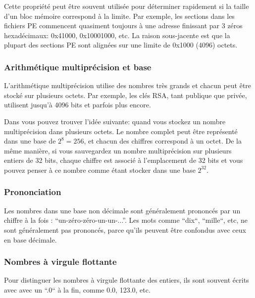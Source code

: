 Cette propriété peut être souvent utilisée pour déterminer rapidement si la taille d'un bloc mémoire correspond à la limite. %
Par exemple, les sections dans les fichiers \ac{PE} commencent quasiment toujours à une adresse finissant par 3 zéros hexadécimaux: 0x41000, 0x10001000, etc.
La raison sous-jacente est que la plupart des sections \ac{PE} sont alignées sur une limite de 0x1000 (4096) octets.

\subsubsection{Arithmétique multiprécision et base}

L'arithmétique multiprécision utilise des nombres très grands et chacun peut être stocké sur plusieurs octets.
Par exemple, les clés RSA, tant publique que privée, utilisent jusqu'à 4096 bits et parfois plus encore.

Dans  vous pouvez trouver l'idée suivante: quand vous stockez un nombre multiprécision
dans plusieurs octets.
Le nombre complet peut être représenté dans une base de $2^8=256$, et chacun des chiffres correspond à un octet.
De la même manière, si vous sauvegardez un nombre multiprécision sur plusieurs entiers de 32 bits, chaque chiffre est associé
 à l'emplacement de 32 bits et vous pouvez penser à ce nombre comme étant stocker dans une base $2^{32}$.

\subsubsection{Prononciation}

Les nombres dans une base non décimale sont généralement prononcés par un chiffre à la fois : ``un-zéro-zéro-un-un-...''.
Les mots comme ``dix``, ``mille``, etc, ne sont généralement pas prononcés, parce qu'ils peuvent être confondus avec ceux en base décimale.

\subsubsection{Nombres à virgule flottante}

Pour distinguer les nombres à virgule flottante des entiers, ils sont souvent écrits avec avec un ``.0`` à la fin,
comme 0.0, 123.0, etc.
